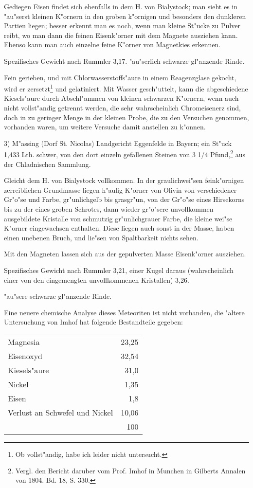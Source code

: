 \documentclass[a4paper, 11pt, oneside]{article}
\begin{document}
Gediegen Eisen findet sich ebenfalls in dem H. von Bialystock; man sieht es in "au"serst kleinen K"ornern in den groben k"ornigen und besonders den dunkleren Partien liegen; besser erkennt man es noch, wenn man kleine St"ucke zu Pulver reibt, wo man dann die feinen Eisenk"orner mit dem Magnete ausziehen kann. Ebenso kann man auch einzelne feine K"orner von Magnetkies erkennen.

Spezifisches Gewicht nach Rummler 3,17. "au"serlich schwarze gl"anzende Rinde.

Fein gerieben, und mit Chlorwasserstoffs"aure in einem Reagenzglase gekocht, wird er zersetzt\footnote{Ob vollst"andig, habe ich leider nicht untersucht.} und gelatiniert. Mit Wasser gesch"uttelt, kann die abgeschiedene Kiesels"aure durch Abschl"ammen von kleinen schwarzen K"ornern, wenn auch nicht vollst"andig getrennt werden, die sehr wahrscheinlich Chromeisenerz sind, doch in zu geringer Menge in der kleinen Probe, die zu den Versuchen genommen, vorhanden waren, um weitere Versuche damit anstellen zu k"onnen.

3) M"assing (Dorf St. Nicolas) Landgericht Eggenfelde in Bayern; ein St"uck 1,433 Lth. schwer, von den dort einzeln gefallenen Steinen von 3 1/4 Pfund,\footnote{Vergl. den Bericht daruber vom Prof. Imhof in Munchen in Gilberts Annalen von 1804. Bd. 18, S. 330.} aus der Chladnischen Sammlung.

Gleicht dem H. von Bialystock vollkommen. In der graulichwei"sen feink"ornigen zerreiblichen Grundmasse liegen h"aufig K"orner von Olivin von verschiedener Gr"o"se und Farbe, gr"unlichgelb bis grasgr"un, von der Gr"o"se eines Hirsekorns bis zu der eines groben Schrotes, dann wieder gr"o"sere unvollkommen ausgebildete Kristalle von schmutzig gr"unlichgrauer Farbe, die kleine wei"se K"orner eingewachsen enthalten. Diese liegen auch sonst in der Masse, haben einen unebenen Bruch, und lie"sen von Spaltbarkeit nichts sehen.

Mit den Magneten lassen sich aus der gepulverten Masse Eisenk"orner ausziehen.

Spezifisches Gewicht nach Rummler 3,21, einer Kugel daraus (wahrscheinlich einer von den eingemengten unvollkommenen Kristallen) 3,26.

"au"sere schwarze gl"anzende Rinde.

Eine neuere chemische Analyse dieses Meteoriten ist nicht vorhanden, die "altere Untersuchung von Imhof hat folgende Bestandteile gegeben:
\begin{center}
\begin{tabular}{ l r }
    Magnesia & 23,25\\
    Eisenoxyd & 32,54\\
    Kiesels"aure & 31,0\\
    Nickel & 1,35\\
    Eisen & 1,8\\
    Verlust an Schwefel und Nickel & 10,06\\
     & 100\\  
\end{tabular}
\end{center}
\end{document}
